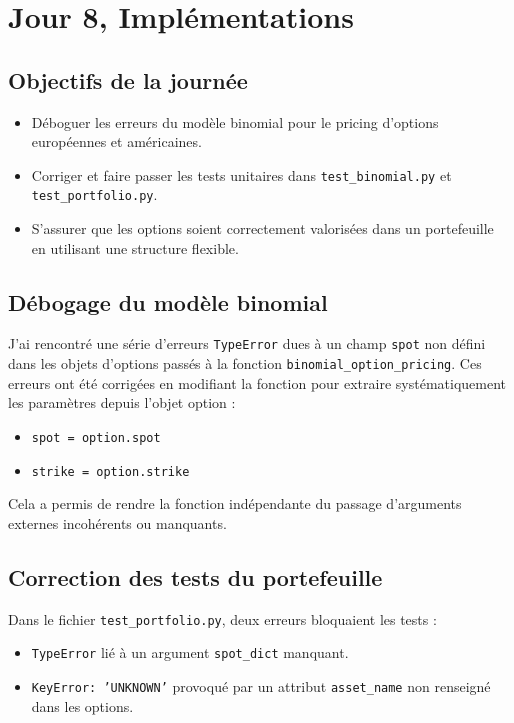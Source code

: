 \documentclass[a4paper,11pt]{article}
\begin{document}
\newpage


\section{Jour 8, Implémentations}

\subsection{Objectifs de la journée}
\begin{itemize}
    \item Déboguer les erreurs du modèle binomial pour le pricing d’options européennes et américaines.
    \item Corriger et faire passer les tests unitaires dans \texttt{test\_binomial.py} et \texttt{test\_portfolio.py}.
    \item S’assurer que les options soient correctement valorisées dans un portefeuille en utilisant une structure flexible.
\end{itemize}

\subsection{Débogage du modèle binomial}

J'ai rencontré une série d'erreurs \texttt{TypeError} dues à un champ \texttt{spot} non défini dans les objets d’options passés à la fonction \texttt{binomial\_option\_pricing}. Ces erreurs ont été corrigées en modifiant la fonction pour extraire systématiquement les paramètres depuis l’objet option :

\begin{itemize}
    \item \texttt{spot = option.spot}
    \item \texttt{strike = option.strike}
\end{itemize}

Cela a permis de rendre la fonction indépendante du passage d’arguments externes incohérents ou manquants.

\subsection{Correction des tests du portefeuille}

Dans le fichier \texttt{test\_portfolio.py}, deux erreurs bloquaient les tests :
\begin{itemize}
    \item \texttt{TypeError} lié à un argument \texttt{spot\_dict} manquant.
    \item \texttt{KeyError: 'UNKNOWN'} provoqué par un attribut \texttt{asset\_name} non renseigné dans les options.
\end{itemize}
\end{document}
